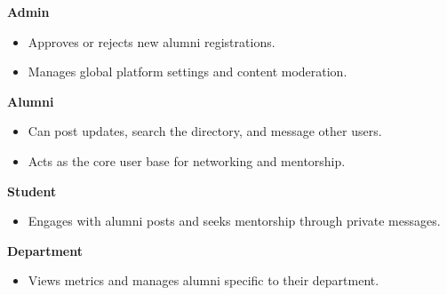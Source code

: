 \noindent \textbf{Admin}
\begin{itemize}
    \item Approves or rejects new alumni registrations.
    \item Manages global platform settings and content moderation.
\end{itemize}
\noindent \textbf{Alumni}
\begin{itemize}
    \item Can post updates, search the directory, and message other users.
    \item Acts as the core user base for networking and mentorship.
\end{itemize}
\noindent \textbf{Student}
\begin{itemize}
    \item Engages with alumni posts and seeks mentorship through private messages.
\end{itemize}
\noindent \textbf{Department}
\begin{itemize}
    \item Views metrics and manages alumni specific to their department.
\end{itemize}
